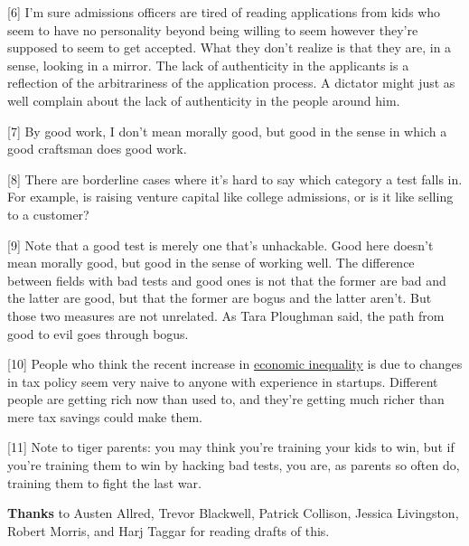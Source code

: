 [6] I'm sure admissions officers are tired
                  of reading applications from kids who seem to have no
                  personality beyond being willing to seem however they're
                  supposed to seem to get accepted. What they don't realize is
                  that they are, in a sense, looking in a mirror. The lack of
                  authenticity in the applicants is a reflection of the
                  arbitrariness of the application process. A dictator might
                  just as well complain about the lack of authenticity in the
                  people around him.

[7] By good work, I don't mean
                  morally good, but good in the sense in which a good craftsman
                  does good work.

[8] There are borderline cases
                  where it's hard to say which category a test falls in. For
                  example, is raising venture capital like college admissions,
                  or is it like selling to a customer?

[9] Note that
                  a good test is merely one that's unhackable. Good here doesn't
                  mean morally good, but good in the sense of working well. The
                  difference between fields with bad tests and good ones is not
                  that the former are bad and the latter are good, but that the
                  former are bogus and the latter aren't. But those two measures
                  are not unrelated. As Tara Ploughman said, the path from good
                  to evil goes through bogus.

[10] People who think
                  the recent increase in
                  \href{http://www.paulgraham.com/ineq.html}{\underline{economic inequality}} is due to
                  changes in tax policy seem very naive to anyone with
                  experience in startups. Different people are getting rich now
                  than used to, and they're getting much richer than mere tax
                  savings could make them.

[11] Note to tiger
                  parents: you may think you're training your kids to win, but
                  if you're training them to win by hacking bad tests, you are,
                  as parents so often do, training them to fight the last
                  war.



\textbf{Thanks} to Austen Allred,
                  Trevor Blackwell, Patrick Collison, Jessica Livingston, Robert
                  Morris, and Harj Taggar for reading drafts of this.


              
            
          
